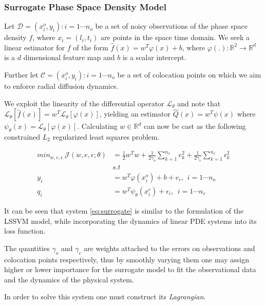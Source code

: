 \documentclass{article}
\begin{document}
\subsubsection*{Surrogate Phase Space Density Model}

Let $\mathcal{D}={(x^{o}_{i}, y_{i}): i = 1 \cdots n_{o}}$ be a set of
noisy observations of the phase space density $f$, where $x_{i} =
(l_{i}, t_{i})$ are points in the space time domain. We seek a linear
estimator for $f$ of the form $\hat{f}(x) = w^{T}\varphi(x) + b$,
where $\varphi(.): \mathbb{R}^{2} \rightarrow \mathbb{R}^{d}$ is a $d$
dimensional feature map and $b$ is a scalar intercept.

Further let $\mathcal{C} ={(x^{o}_{i}, y_{i}): i = 1 \cdots n_{o}}$ be 
a set of colocation points on which we aim to enforce radial diffusion
dynamics.

We exploit the linearity of the differential operator
$\mathcal{L}_{\theta}$ and note that $\mathcal{L}_{\theta} [\hat{f}(x)]
= w^{T} \mathcal{L}_{\theta}[\varphi(x)]$, yielding an estimator
$\hat{Q}(x) = w^{T}\psi(x)$ where $\psi_{\theta}(x) =
\mathcal{L}_{\theta}[\varphi(x)]$. Calculating $w \in \mathbb{R}^d$
can now be cast as the following constrained $L_2$ regularized 
least squares problem.

\begin{align}\label{eq:surrogate}
   min_{w,e,\epsilon} \ \mathcal{J}(w,e,\epsilon;\theta) &= 
   \frac{1}{2} w^{T}w + \frac{1}{2\gamma_{o}} \sum_{k = 1}^{n_{o}}{e^{2}_{k}} + \frac{1}{2\gamma_{c}} \sum_{k = 1}^{n_{c}}{\epsilon^{2}_{k}} \\
  & s.t \nonumber \\
  y_{i} & = w^{T}\varphi(x^{o}_{i}) + b + e_{i}, \ \ i = 1 \cdots n_{o} \\
  q_{i} & = w^{T}\psi_{\theta}(x^{c}_{i}) + \epsilon_{i}, \ \ i = 1 \cdots n_{c}
\end{align}

It can be seen that system \ref{eq:surrogate} is similar to the
formulation of the LSSVM model, while incorporating the dynamics of
linear PDE systems into its loss function. 

The quantities $\gamma_{o}$ and $\gamma_{c}$ are weights attached to
the errors on observations and colocation points respectively, thus
by smoothly varying them one may assign higher or lower importance for
the surrogate model to fit the observational data and the dynamics of
the physical system.

In order to solve this system one must construct its
\emph{Lagrangian}.
\end{document}
